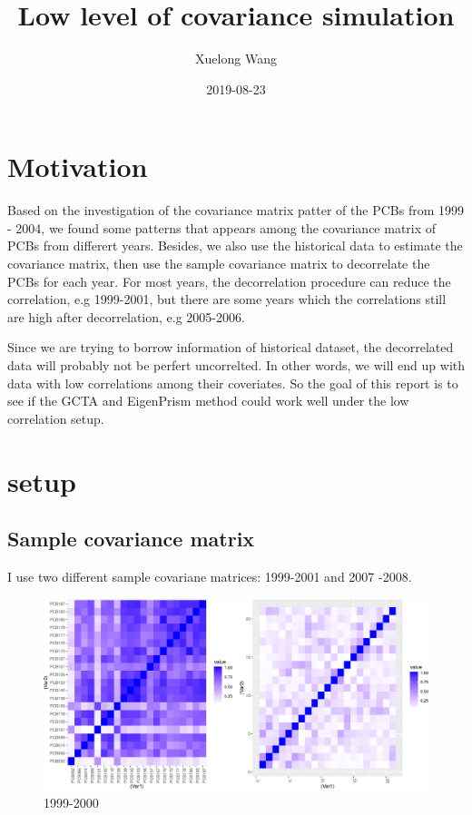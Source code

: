 \documentclass[]{article}
\title{Low level of covariance simulation}
\author{Xuelong Wang}
\date{2019-08-23}
\begin{document}
\maketitle

{
\setcounter{tocdepth}{2}
\tableofcontents
}
\section{Motivation}\label{motivation}

Based on the investigation of the covariance matrix patter of the PCBs
from 1999 - 2004, we found some patterns that appears among the
covariance matrix of PCBs from differert years. Besides, we also use the
historical data to estimate the covariance matrix, then use the sample
covariance matrix to decorrelate the PCBs for each year. For most years,
the decorrelation procedure can reduce the correlation, e.g 1999-2001,
but there are some years which the correlations still are high after
decorrelation, e.g 2005-2006.

Since we are trying to borrow information of historical dataset, the
decorrelated data will probably not be perfert uncorrelted. In other
words, we will end up with data with low correlations among their
coveriates. So the goal of this report is to see if the GCTA and
EigenPrism method could work well under the low correlation setup.

\section{setup}\label{setup}

\subsection{Sample covariance matrix}\label{sample-covariance-matrix}

I use two different sample covariane matrices: 1999-2001 and 2007 -2008.

\begin{figure}
\centering
\includegraphics{Low_levels_covariance_files/figure-latex/unnamed-chunk-2-1.pdf}
\caption{1999-2000}
\end{figure}
\end{document}
